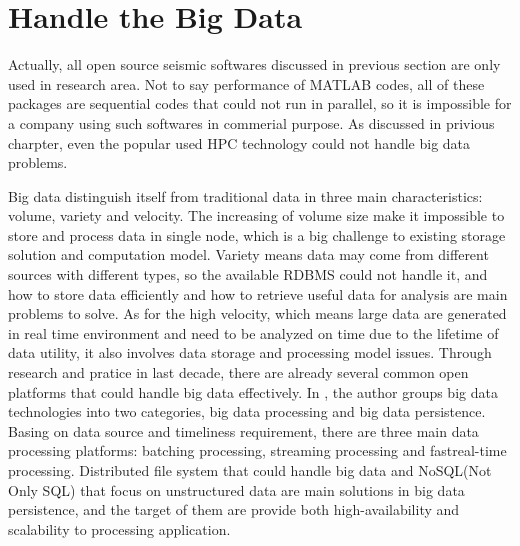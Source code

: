 \section{Handle the Big Data}
Actually, all open source seismic softwares discussed in previous section are only used in research area. Not to say performance of MATLAB codes, all of these packages are sequential codes that could not run in parallel, so it is impossible for a company using such softwares in commerial purpose. As discussed in privious charpter, even the popular used HPC technology could not handle big data problems. 

Big data distinguish itself from traditional data in three main characteristics: volume, variety and velocity\cite{CharactOfBigData}. The increasing of volume size make it impossible to store and process data in single node, which is a big challenge to existing storage solution and computation model. Variety means data may come from different sources with different types, so the available RDBMS could not handle it, and how to store data efficiently and how to retrieve useful data for analysis are main problems to solve. As for the high velocity, which means large data are generated in real time environment and need to be analyzed on time due to the lifetime of data utility\cite{CharactOfBigData}, it also involves data storage and processing model issues. Through research and pratice in last decade, there are already several common open platforms that could handle big data effectively. In \cite{ChallengeOfBigData}, the author groups big data technologies into two categories, big data processing and big data persistence. Basing on data source and timeliness requirement, there are three main data processing platforms: batching processing, streaming processing and fast\/real-time processing. Distributed file system that could handle big data and NoSQL(Not Only SQL) that focus on unstructured data are main solutions in big data persistence, and the target of them are provide both high-availability and scalability to processing application.  


